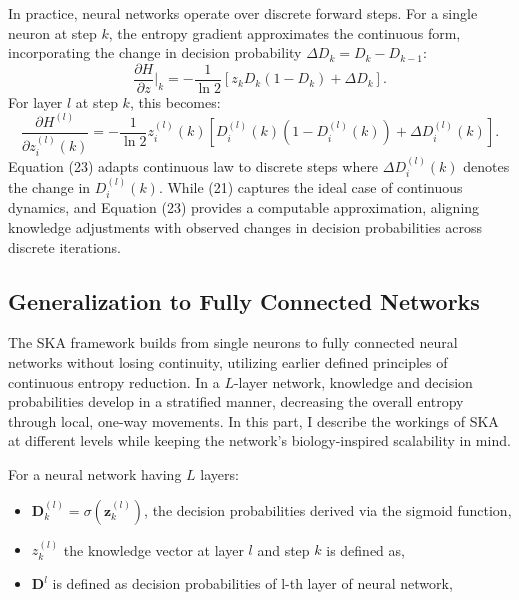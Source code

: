 \documentclass{article}
\begin{document}
In practice, neural networks operate over discrete forward steps. For a single neuron at step \( k \), the entropy gradient approximates the continuous form, incorporating the change in decision probability \( \Delta D_k = D_k - D_{k-1} \):
\begin{equation}
	\frac{\partial H}{\partial z} \big|_k = -\frac{1}{\ln 2} \left[ z_k D_k (1 - D_k) + \Delta D_k \right].
\end{equation}
For layer \( l \) at step \( k \), this becomes:
\begin{equation}
	\frac{\partial H^{(l)}}{\partial z_i^{(l)}(k)} = -\frac{1}{\ln 2} z_i^{(l)}(k) \left[ D_i^{(l)}(k) \left(1 - D_i^{(l)}(k)\right) + \Delta D_i^{(l)}(k) \right].
\end{equation}
Equation (23) adapts continuous law to discrete steps where \( \Delta D_i^{(l)}(k) \) denotes the change in \( D_i^{(l)}(k) \). While (21) captures the ideal case of continuous dynamics, and Equation (23) provides a computable approximation, aligning knowledge adjustments with observed changes in decision probabilities across discrete iterations.
\subsection{Generalization to Fully Connected Networks}

The SKA framework builds from single neurons to fully connected neural networks without losing continuity, utilizing earlier defined principles of continuous entropy reduction. In a \( L \)-layer network, knowledge and decision probabilities develop in a stratified manner, decreasing the overall entropy through local, one-way movements. In this part, I describe the workings of SKA at different levels while keeping the network's biology-inspired scalability in mind.

For a neural network having \(L\) layers:  

\begin{itemize}  

	\item \(\mathbf{D}^{(l)}_k = \sigma(\mathbf{z}^{(l)}_k)\), the decision probabilities derived via the sigmoid function,  

	\item \(z_k^{(l)}\) the knowledge vector at layer \(l\) and step \(k\) is defined as,  

	\item \(\mathbf{D}^{l}\) is defined as decision probabilities of l-th layer of neural network,  
\end{itemize}  
\end{document}
